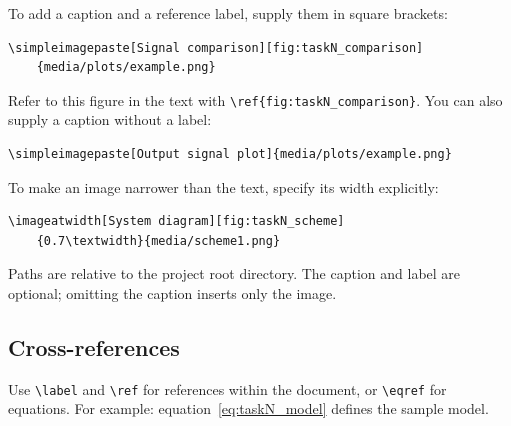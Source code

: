 To add a caption and a reference label, supply them in square brackets:
\begin{verbatim}
\simpleimagepaste[Signal comparison][fig:taskN_comparison]
    {media/plots/example.png}
\end{verbatim}
Refer to this figure in the text with
\verb|\ref{fig:taskN_comparison}|.
You can also supply a caption without a label:
\begin{verbatim}
\simpleimagepaste[Output signal plot]{media/plots/example.png}
\end{verbatim}

To make an image narrower than the text, specify its width explicitly:
\begin{verbatim}
\imageatwidth[System diagram][fig:taskN_scheme]
    {0.7\textwidth}{media/scheme1.png}
\end{verbatim}

Paths are relative to the project root directory. The caption and label are
optional; omitting the caption inserts only the image.


\subsection{Cross-references}
Use \texttt{\textbackslash label} and \texttt{\textbackslash ref} for references
within the document, or \texttt{\textbackslash eqref} for equations.
For example: equation~\eqref{eq:taskN_model} defines the sample model.
